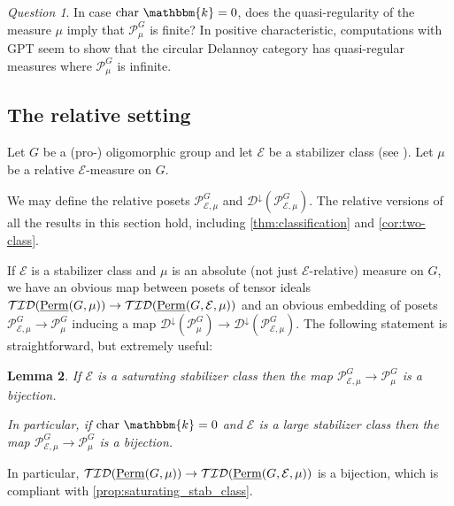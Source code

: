 \documentclass[11pt,a4paper]{amsart}
\theoremstyle{plain}%
\newtheorem{lemma}{Lemma}[subsection]
\theoremstyle{definition}
\theoremstyle{remark}
\newtheorem{question}[lemma]{Question}
\newcommand{\Perm}{\underline{{\rm Perm}}}
\newcommand{\kk}{\mathbbm{k}}
\newcommand{\Down}{\mathcal{D}^{\downarrow}}
\newcommand{\Sub}{\mathbf{Sub}}
\newcommand{\cE}{\mathcal{E}}
\begin{document}
\begin{question} In case $\mathrm{char}~\kk=0$, does the quasi-regularity of the measure $\mu$ imply that $\mathcal{P}_{\mu}^G$ is finite? In positive characteristic, computations with GPT seem to show that the circular Delannoy category has quasi-regular measures where $\mathcal{P}_{\mu}^G$ is infinite.
\end{question}







\subsection{The relative setting}\label{ssec:rel_setting_ideals}
Let $G$ be a (pro-) oligomorphic group and let $\mathcal{E}$ be a stabilizer class (see \cite[Section 2.6]{HS-oligomorphic}). Let $\mu$ be a relative $\mathcal{E}$-measure on $G$. 

We may define the relative posets $\mathcal{P}_{\cE, \mu}^G$ and $\Down(\mathcal{P}_{\cE, \mu}^G)$. The relative versions of all the results in this section hold, including \cref{thm:classification} and \cref{cor:two-class}. 

If $\mathcal{E}$ is a stabilizer class and $\mu$ is an absolute (not just $\mathcal{E}$-relative) measure on $G$, we have an obvious map between posets of tensor ideals $\mathcal{TID}(\Perm(G,  \mu)) \to   \mathcal{TID}(\Perm(G, \mathcal{E}, \mu))$ and an obvious embedding of posets $\mathcal{P}_{\cE, \mu}^G \to  \mathcal{P}_{\mu}^G$ inducing a map $\Down(\mathcal{P}_{ \mu}^G) \to  \Down(\mathcal{P}_{\cE,\mu}^G)$.
The following statement is straightforward, but extremely useful:
\begin{lemma}\label{lem:saturating_class_poset_equiv}
  If $\mathcal{E}$ is a saturating stabilizer class then the map $\mathcal{P}_{\cE, \mu}^G \to  \mathcal{P}_{\mu}^G$ is a bijection.  

  In particular, if $\mathrm{char}~\kk=0$ and $\mathcal{E}$ is a large stabilizer class then the map $\mathcal{P}_{\cE, \mu}^G \to  \mathcal{P}_{\mu}^G$ is a bijection.
\end{lemma}
 In particular, $\mathcal{TID}(\Perm(G,  \mu)) \to   \mathcal{TID}(\Perm(G, \mathcal{E}, \mu))$ is a bijection, which is compliant with \cref{prop:saturating_stab_class}.

\end{document}
